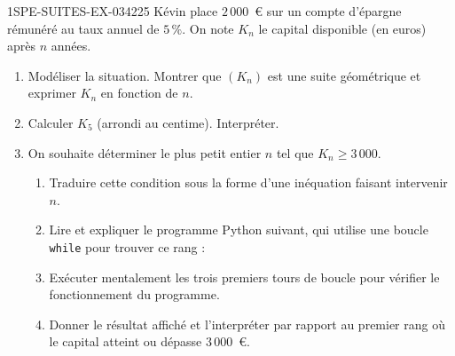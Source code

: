 \begin{exercice}{1SPE-SUITES-EX-034}{2}{25}
Kévin place $2\,000$~\euro{} sur un compte d'épargne rémunéré au taux annuel de $5\,\%$. On note $K_n$ le capital disponible (en euros) après $n$ années.

\begin{enumerate}
  \item Modéliser la situation. Montrer que $(K_n)$ est une suite géométrique et exprimer $K_n$ en fonction de $n$.

  \item Calculer $K_5$ (arrondi au centime). Interpréter.

  \item On souhaite déterminer le plus petit entier $n$ tel que $K_n \geq 3\,000$.
  \begin{enumerate}
    \item Traduire cette condition sous la forme d'une inéquation faisant intervenir $n$.
    \item Lire et expliquer le programme Python suivant, qui utilise une boucle \texttt{while} pour trouver ce rang :

\medskip


\medskip
    \item Exécuter mentalement les trois premiers tours de boucle pour vérifier le fonctionnement du programme.
    \item Donner le résultat affiché et l'interpréter par rapport au premier rang où le capital atteint ou dépasse $3\,000$~\euro{}.
  \end{enumerate}
\end{enumerate}
\end{exercice}
